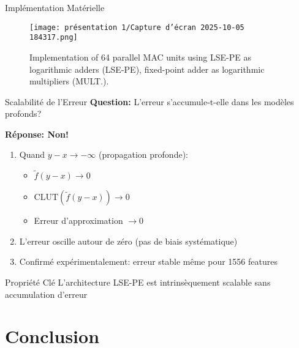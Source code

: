 \documentclass[aspectratio=169]{beamer}
\begin{document}
\begin{frame}{Implémentation Matérielle}

\begin{figure}
    \centering
    \texttt{[image: présentation 1/Capture d'écran 2025-10-05 184317.png]}
    \caption{Implementation of 64 parallel MAC units using
LSE-PE as logarithmic adders (LSE-PE), fixed-point adder as
logarithmic multipliers (MULT.).}
    \label{fig:enter-label}
\end{figure}
    
\end{frame}

\begin{frame}{Scalabilité de l'Erreur}
\textbf{Question:} L'erreur s'accumule-t-elle dans les modèles profonds?

\vspace{0.3cm}
\textbf{Réponse: Non!}
\begin{enumerate}
\item Quand $y - x \to -\infty$ (propagation profonde):
   \begin{itemize}
   \item $\tilde{f}(y-x) \to 0$
   \item $\text{CLUT}(\tilde{f}(y-x)) \to 0$
   \item Erreur d'approximation $\to 0$
   \end{itemize}

\item L'erreur oscille autour de zéro (pas de biais systématique)

\item Confirmé expérimentalement: erreur stable même pour 1556 features
\end{enumerate}

\vspace{0.3cm}
\begin{alertblock}{Propriété Clé}
L'architecture LSE-PE est intrinsèquement scalable sans accumulation d'erreur
\end{alertblock}
\end{frame}

\section{Conclusion}
\end{document}
